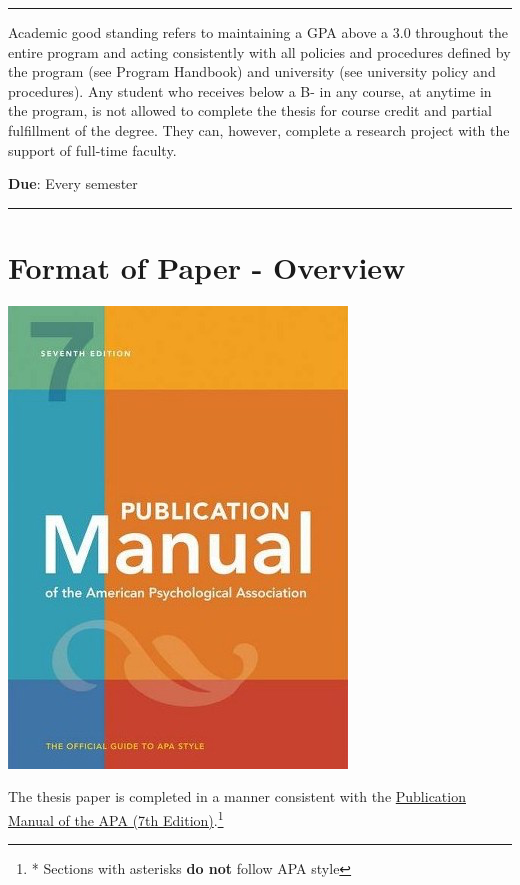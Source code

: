 \documentclass[openany]{book}
\begin{document}
\begin{center}\rule{0.5\linewidth}{0.5pt}\end{center}

Academic good standing refers to maintaining a GPA above a 3.0 throughout the entire program and acting consistently with all policies and procedures defined by the program (see Program Handbook) and university (see university policy and procedures). Any student who receives below a B- in any course, at anytime in the program, is not allowed to complete the thesis for course credit and partial fulfillment of the degree. They can, however, complete a research project with the support of full-time faculty.

\textbf{Due}: Every semester

\begin{center}\rule{0.5\linewidth}{0.5pt}\end{center}

\hypertarget{format-of-paper---overview}{%
\chapter{Format of Paper - Overview}\label{format-of-paper---overview}}

\includegraphics{images/apamanual.png}

The thesis paper is completed in a manner consistent with the \href{https://www.amazon.com/s?k=apa+publication+manual+7th+edition\&crid=7T10VJ2PYQZH\&sprefix=apa+pu\%2Caps\%2C261\&ref=nb_sb_ss_i_1_6}{Publication Manual of the APA (7th Edition)}.\footnote{* Sections with asterisks \textbf{do not} follow APA style}
\end{document}
